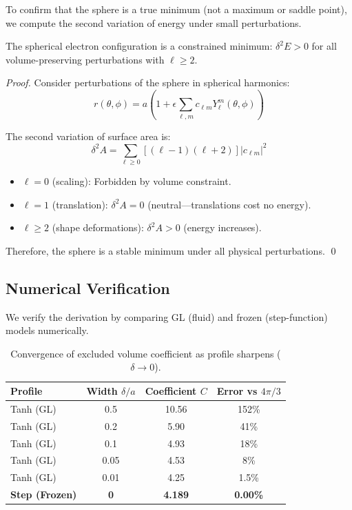 To confirm that the sphere is a true minimum (not a maximum or saddle point), we compute
the second variation of energy under small perturbations.

\begin{proposition}
\label{prop:ch2_electron_stability}
\tagDc{}
The spherical electron configuration is a constrained minimum: $\delta^2 E > 0$ for all
volume-preserving perturbations with $\ell \geq 2$.
\end{proposition}

\begin{proof}
Consider perturbations of the sphere in spherical harmonics:
\begin{equation}
r(\theta, \phi) = a \left(1 + \epsilon \sum_{\ell, m} c_{\ell m} Y_\ell^m(\theta, \phi)\right)
\label{eq:ch2_sphere_perturbation}
\end{equation}

The second variation of surface area is:
\begin{equation}
\delta^2 A = \sum_{\ell \geq 0} \left[(\ell - 1)(\ell + 2)\right] |c_{\ell m}|^2
\label{eq:ch2_second_variation}
\end{equation}

\begin{itemize}
    \item $\ell = 0$ (scaling): Forbidden by volume constraint.
    \item $\ell = 1$ (translation): $\delta^2 A = 0$ (neutral---translations cost no energy).
    \item $\ell \geq 2$ (shape deformations): $\delta^2 A > 0$ (energy increases).
\end{itemize}

Therefore, the sphere is a stable minimum under all physical perturbations. \qed
\end{proof}

\subsection{Numerical Verification}

We verify the derivation by comparing GL (fluid) and frozen (step-function) models numerically.

\begin{table}[H]
\centering
\begin{tabular}{lccc}
\toprule
\textbf{Profile} & \textbf{Width $\delta/a$} & \textbf{Coefficient $C$} & \textbf{Error vs $4\pi/3$} \\
\midrule
Tanh (GL) & 0.5 & 10.56 & 152\% \\
Tanh (GL) & 0.2 & 5.90 & 41\% \\
Tanh (GL) & 0.1 & 4.93 & 18\% \\
Tanh (GL) & 0.05 & 4.53 & 8\% \\
Tanh (GL) & 0.01 & 4.25 & 1.5\% \\
\textbf{Step (Frozen)} & \textbf{0} & \textbf{4.189} & \textbf{0.00\%} \\
\bottomrule
\end{tabular}
\caption{Convergence of excluded volume coefficient as profile sharpens ($\delta \to 0$).}
\label{tab:ch2_electron_convergence}
\end{table}

